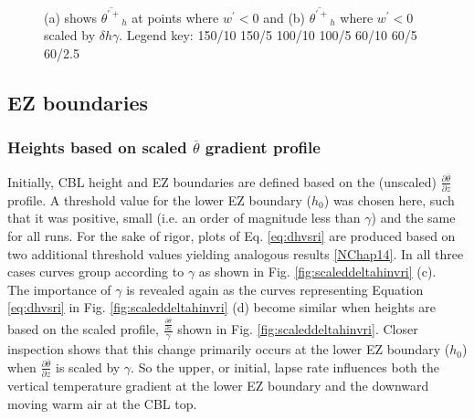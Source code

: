\begin{figure}[htbp]
\begin{minipage}[b]{0.5\linewidth}
        \end{minipage}
        \caption[Downward moving positive potential temperature fluctuations at $h$]{(a) shows $\overline{\theta^{\prime+}}_{h}$ at points where $w^{\prime}<0$ and (b) $\overline{\theta^{\prime+}}_{h}$ where $w^{\prime}<0$ scaled by $\delta h \gamma$.  Legend key:{\color{red} } 150/10  150/5 \hspace{2mm} {\color{black} } 100/10 \hspace{2mm} {\color{black} } 100/5 \hspace{2mm} {\color{offyellow} } 60/10 \hspace{2mm} {\color{offyellow} } 60/5 \hspace{2mm} {\color{offyellow} } 60/2.5}
        \label{fig:downwarm_theta}
\end{figure}
\clearpage

\subsection{EZ boundaries}


\subsubsection{Heights based on scaled $\overline{\theta}$ gradient profile}

Initially, CBL height and EZ boundaries are defined based on the (unscaled) $\frac{\partial \overline{\theta}}{\partial z}$ profile. A threshold value for the lower EZ boundary ($h_{0}$) was chosen here, such that it was positive, small (i.e. an order of magnitude less than $\gamma$) and the same for all runs.  For the sake of rigor, plots of Eq. \ref{eq:dhvsri} are produced based on two additional threshold values yielding analogous results \ref{NChap14}.  In all three cases curves group according to $\gamma$ as shown in Fig. \ref{fig:scaleddeltahinvri} (c).\\

The importance of $\gamma$ is revealed again as the curves representing Equation \ref{eq:dhvsri} in Fig. \ref{fig:scaleddeltahinvri} (d) become similar when heights are based on the scaled profile, $\frac{\frac{\partial \overline{\theta}}{\partial z}}{\gamma}$ shown in Fig. \ref{fig:scaleddeltahinvri}. Closer inspection shows that this change primarily occurs at the lower EZ boundary ($h_{0}$) when $\frac{\partial \overline{\theta}}{\partial z}$ is scaled by $\gamma$. So the upper, or initial, lapse rate influences both the vertical temperature gradient at the lower EZ boundary and the downward moving warm air at the CBL top.\\


